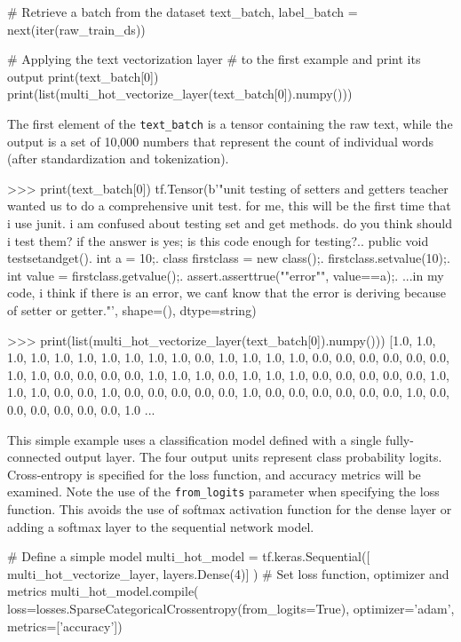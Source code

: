 \begin{pythoncode}
# Retrieve a batch from the dataset
text_batch, label_batch = next(iter(raw_train_ds))

# Applying the text vectorization layer
# to the first example and print its output
print(text_batch[0])
print(list(multi_hot_vectorize_layer(text_batch[0]).numpy()))
\end{pythoncode}

The first element of the \texttt{text\_batch} is a tensor containing the raw text, while the output is a set of 10,000 numbers that represent the count of individual words (after standardization and tokenization).

\begin{textcode}
>>> print(text_batch[0])
tf.Tensor(b'"unit testing of setters and getters teacher wanted us 
to do a comprehensive unit test. for me, this will be the first time 
that i use junit. i am confused about testing set and get methods. 
do you think should i test them? if the answer is yes; is this code 
enough for testing?..  public void testsetandget(){.    int a = 10;.    
class firstclass = new class();.    firstclass.setvalue(10);.    int
value = firstclass.getvalue();.    assert.asserttrue(""error"", 
value==a);.  }...in my code, i think if there is an error, we can\'t
know that the error is deriving because of setter or getter."\n', 
shape=(), dtype=string)

>>> print(list(multi_hot_vectorize_layer(text_batch[0]).numpy()))
[1.0, 1.0, 1.0, 1.0, 1.0, 1.0, 1.0, 1.0, 1.0, 1.0, 0.0, 1.0, 1.0, 
1.0, 1.0, 0.0, 0.0, 0.0, 0.0, 0.0, 0.0, 1.0, 1.0, 0.0, 0.0, 0.0, 
0.0, 1.0, 1.0, 1.0, 0.0, 1.0, 1.0, 1.0, 0.0, 0.0, 0.0, 0.0, 0.0, 
1.0, 1.0, 1.0, 0.0, 0.0, 1.0, 0.0, 0.0, 0.0, 0.0, 0.0, 1.0, 0.0, 
0.0, 0.0, 0.0, 0.0, 0.0, 1.0, 0.0, 0.0, 0.0, 0.0, 0.0, 0.0, 1.0
...
\end{textcode}

This simple example uses a classification model defined with a single fully-connected output layer. The four output units represent class probability logits. Cross-entropy is specified for the loss function, and accuracy metrics will be examined. Note the use of the \texttt{from\_logits} parameter when specifying the loss function. This avoids the use of softmax activation function for the dense layer or adding a softmax layer to the sequential network model.

\begin{pythoncode}
# Define a simple model
multi_hot_model = tf.keras.Sequential([
    multi_hot_vectorize_layer,
    layers.Dense(4)]
)
# Set loss function, optimizer and metrics
multi_hot_model.compile(
    loss=losses.SparseCategoricalCrossentropy(from_logits=True),
    optimizer='adam', metrics=['accuracy'])
\end{pythoncode}

